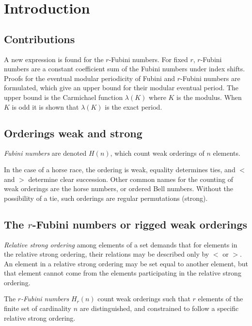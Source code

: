 \documentclass[12pt,reqno]{article}
\begin{document}
\section{Introduction}

\subsection{Contributions}

A new expression is found for the $r$-Fubini numbers. For fixed $r$, $r$-Fubini numbers are a constant coefficient sum of the  Fubini numbers under index shifts.  Proofs for the eventual modular periodicity of Fubini and $r$-Fubini numbers are formulated, which give an upper bound for their modular eventual period. The upper bound is the Carmichael function $\lambda(K)$ where $K$ is the modulus. When $K$ is odd it is shown that $\lambda(K)$ is the exact period.

\subsection{Orderings weak and strong}

\begin{definition}
	{\em Fubini numbers} are denoted $H(n)$, which count weak orderings of $n$ elements.
\end{definition}

In the case of a horse race, the ordering is weak, equality determines ties, and $<$ and $>$ determine clear succession. Other common names for the counting of weak orderings are the horse numbers, or  ordered Bell numbers. Without the  possibility of a tie, such orderings are regular permutations (strong).

\subsection{The $r$-Fubini numbers or rigged weak orderings}
\begin{definition}
 {\em Relative strong ordering} among elements of a set demands that for elements in the relative strong ordering, their relations may be described only by $<$ or $>$. An element in a relative strong ordering may be set equal to another element, but that element cannot come from the elements participating in the relative strong ordering.
\end{definition}
\begin{definition}
	The {\em $r$-Fubini numbers} $H_{r}(n)$ count weak orderings such that $r$ elements of the finite set of cardinality $n$ are distinguished, and constrained to follow a specific relative strong ordering.
\end{definition}
\end{document}
